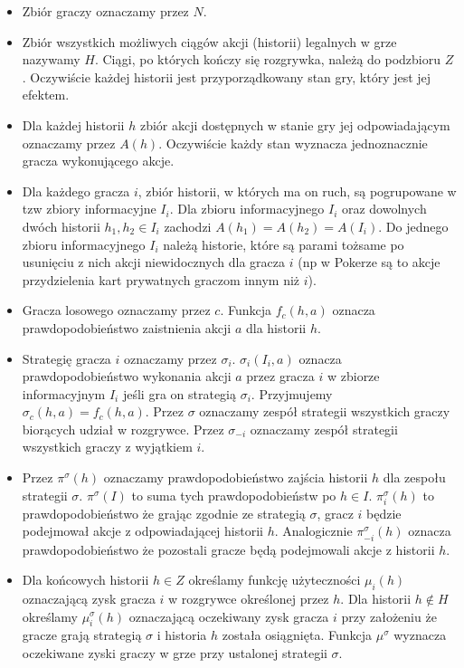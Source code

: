\documentclass[licencjacka]{pracamgr}
\begin{document}
\begin{itemize}

\item Zbiór graczy oznaczamy przez $N$.
\item Zbiór wszystkich możliwych ciągów akcji (historii) legalnych w grze nazywamy $H$. Ciągi, po których kończy
      się rozgrywka, należą do podzbioru $Z$. Oczywiście każdej historii jest przyporządkowany stan gry, który
      jest jej efektem.
\item Dla każdej historii $h$ zbiór akcji dostępnych w stanie gry jej odpowiadającym oznaczamy przez $A(h)$. Oczywiście
      każdy stan wyznacza jednoznacznie gracza wykonującego akcje.
\item Dla każdego gracza $i$, zbiór historii, w których ma on ruch, są pogrupowane w tzw zbiory informacyjne $I_i$. Dla zbioru
      informacyjnego $I_i$ oraz dowolnych dwóch historii $h_1, h_2 \in I_i$ zachodzi $A(h_1) = A(h_2) = A(I_i)$. Do jednego
      zbioru informacyjnego $I_i$ należą historie, które są parami tożsame po usunięciu z nich akcji niewidocznych dla gracza $i$
      (np w Pokerze są to akcje przydzielenia kart prywatnych graczom innym niż $i$).
\item Gracza losowego oznaczamy przez $c$. Funkcja $f_c(h, a)$ oznacza prawdopodobieństwo zaistnienia akcji $a$ dla historii $h$.
\item Strategię gracza $i$ oznaczamy przez $\sigma_i$. $\sigma_i(I_i, a)$ oznacza prawdopodobieństwo wykonania akcji $a$ przez
      gracza $i$ w zbiorze informacyjnym $I_i$ jeśli gra on strategią $\sigma_i$. Przyjmujemy $\sigma_c(h, a) = f_c(h, a)$.
      Przez $\sigma$ oznaczamy zespół strategii wszystkich graczy biorących udział w rozgrywce. Przez $\sigma_{-i}$ oznaczamy
      zespół strategii wszystkich graczy z wyjątkiem $i$.
\item Przez $\pi^{\sigma}(h)$ oznaczamy prawdopodobieństwo zajścia historii $h$ dla zespołu strategii $\sigma$.
      $\pi^{\sigma}(I)$ to suma tych prawdopodobieństw po $h \in I$. $\pi_i^{\sigma}(h)$ to prawdopodobieństwo że grając
      zgodnie ze strategią $\sigma$, gracz $i$ będzie podejmował akcje z odpowiadającej historii $h$. Analogicznie
      $\pi_{-i}^{\sigma}(h)$ oznacza prawdopodobieństwo że pozostali gracze będą podejmowali akcje z historii $h$.
\item Dla końcowych historii $h \in Z$ określamy funkcję użyteczności $\mu_i(h)$ oznaczającą zysk gracza $i$ w rozgrywce
      określonej przez $h$. Dla historii $h \notin H$ określamy $\mu_i^{\sigma}(h)$ oznaczającą oczekiwany zysk gracza $i$
      przy założeniu że gracze grają strategią $\sigma$ i historia $h$ została osiągnięta. Funkcja $\mu^{\sigma}$ wyznacza
      oczekiwane zyski graczy w grze przy ustalonej strategii $\sigma$.

\end{itemize}
\end{document}
